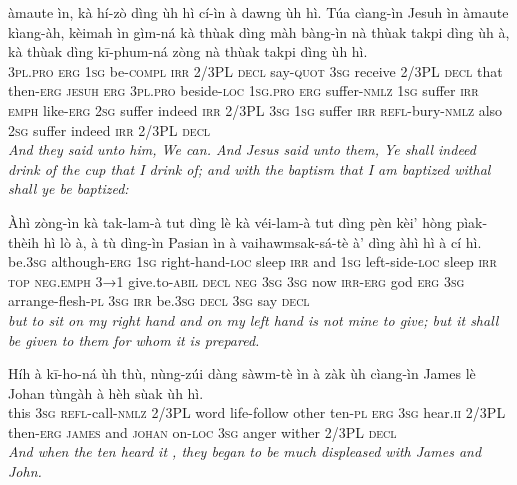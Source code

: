\documentclass[11pt,a4paper]{article}
\begin{document}
\begin{exe}
\gll àmaute ìn, kà hí-zò dìng ùh hì cí-ìn à dawng ùh hì. Túa cìang-ìn Jesuh ìn àmaute kìang-àh, kèimah ìn gìm-ná kà thùak dìng màh bàng-ìn nà thùak takpi dìng ùh à, kà thùak dìng kī-phum-ná zòng nà thùak takpi dìng ùh hì. \\
     \textsc{3pl}.\textsc{pro} \textsc{erg} \textsc{1sg} be-\textsc{compl} \textsc{irr} 2/3PL \textsc{decl} say-\textsc{quot} \textsc{3sg} receive 2/3PL \textsc{decl} that then-\textsc{erg} \textsc{jesuh} \textsc{erg} \textsc{3pl}.\textsc{pro} beside-\textsc{loc} \textsc{1sg}.\textsc{pro} \textsc{erg} suffer-\textsc{nmlz} \textsc{1sg} suffer \textsc{irr} \textsc{emph} like-\textsc{erg} \textsc{2sg} suffer indeed \textsc{irr} 2/3PL \textsc{3sg} \textsc{1sg} suffer \textsc{irr} \textsc{refl}-bury-\textsc{nmlz} also \textsc{2sg} suffer indeed \textsc{irr} 2/3PL \textsc{decl} \\
\glt \textcolor{kjvcolor}{\textit{And they said unto him, We can. And Jesus said unto them, Ye shall indeed drink of the cup that I drink of; and with the baptism that I am baptized withal shall ye be baptized:}}

\gll Àhì zòng-ìn kà tak-lam-à tut dìng lè kà véi-lam-à tut dìng pèn kèi' hòng pìak-thèih hì lò à, à tù dìng-ìn Pasian ìn à vaihawmsak-sá-tè à' dìng àhì hì à cí hì. \\
     be.\textsc{3sg} although-\textsc{erg} \textsc{1sg} right-hand-\textsc{loc} sleep \textsc{irr} and \textsc{1sg} left-side-\textsc{loc} sleep \textsc{irr} \textsc{top} \textsc{neg}.\textsc{emph} \textsc{3→1} give.to-\textsc{abil} \textsc{decl} \textsc{neg} \textsc{3sg} \textsc{3sg} now \textsc{irr}-\textsc{erg} god \textsc{erg} \textsc{3sg} arrange-flesh-\textsc{pl} \textsc{3sg} \textsc{irr} be.\textsc{3sg} \textsc{decl} \textsc{3sg} say \textsc{decl} \\
\glt \textcolor{kjvcolor}{\textit{but to sit on my right hand and on my left hand is not mine to give; but it shall be given to them for whom it is prepared.}}

\gll Híh à kī-ho-ná ùh thù, nùng-zúi dàng sàwm-tè ìn à zàk ùh cìang-ìn James lè Johan tùngàh à hèh sùak ùh hì. \\
     this \textsc{3sg} \textsc{refl}-call-\textsc{nmlz} 2/3PL word life-follow other ten-\textsc{pl} \textsc{erg} \textsc{3sg} hear.\textsc{ii} 2/3PL then-\textsc{erg} \textsc{james} and \textsc{johan} on-\textsc{loc} \textsc{3sg} anger wither 2/3PL \textsc{decl} \\
\glt \textcolor{kjvcolor}{\textit{And when the ten heard it , they began to be much displeased with James and John.}}


\end{exe}
\end{document}
